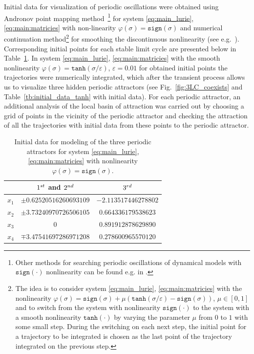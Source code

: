 \documentclass{ifacconf}
\theoremstyle{plain}
\begin{document}
Initial data for visualization of periodic oscillations were obtained using
Andronov point mapping method~\citep{AndronovVKh-1966}\footnote{Other methods for searching periodic oscillations
of dynamical models with $\texttt{sign}(\cdot)$ nonlinearity
can be found e.g. in \citep{Tsypkin-1984,Boiko-2008}.}
for system \eqref{eq:main_lurie}, \eqref{eq:main:matricies}
with non-linearity $\varphi(\sigma) = \texttt{sign}(\sigma)$
and numerical continuation method\footnote{
The idea is to consider system \eqref{eq:main_lurie}, \eqref{eq:main:matricies}
  with the nonlinearity $\varphi(\sigma) = \texttt{sign}(\sigma)
  + \mu (\texttt{tanh}(\sigma / \varepsilon) - \texttt{sign}(\sigma))$, $\mu \in [0,1]$
  and to switch from the system with
  nonlinearity $\texttt{sign}(\cdot)$ to the system with a smooth nonlinearity
  $\texttt{tanh}(\cdot)$ by varying the parameter $\mu$ from $0$ to $1$ with some small step.
  During the switching on each next step,
  the initial point for a trajectory to be integrated is chosen
  as the last point of the trajectory integrated on the previous step.
} for smoothing the discontinuous nonlinearity
(see e.g.~\citep{LeonovK-2013-IJBC,LeonovKKM-2017}).
Corresponding initial points for each stable limit cycle
are presented below in Table~\ref{tb:initial_data_sign}.
In system \eqref{eq:main_lurie}, \eqref{eq:main:matricies}
with the smooth nonlinearity $\varphi(\sigma) = \texttt{tanh}(\sigma / \varepsilon)$,
$\varepsilon = 0.01$
for obtained initial points the trajectories were numerically integrated,
which after the transient process allows us to visualize
three hidden periodic attractors (see Fig.~\ref{fig:3LC_coexists} and
Table~\ref{tb:initial_data_tanh} with initial data).
For each periodic attractor, an additional analysis of the local basin of attraction was carried out
by choosing a grid of points in the vicinity of the periodic attractor and checking the attraction
of all the trajectories with initial data from these points to the periodic attractor.
\begin{table}[h!]
\begin{center}
\caption{Initial data for modeling of the three
periodic attractors for system \eqref{eq:main_lurie}, \eqref{eq:main:matricies}
with nonlinearity $\varphi(\sigma) = \texttt{sign}(\sigma)$.}\label{tb:initial_data_sign}
\begin{tabular}{ccc}
& $1^{\rm st}$ and $2^{\rm nd}$ & $3^{\rm rd}$\\
\hline\hline
$x_1$ & $\pm0.62520516260693109$ & $-2.113517446278802$ \\
$x_2$ & $\pm3.73240970726506105$ & $0.664336179538623$ \\
$x_3$ & $0$ & $0.891912878629890$ \\
$x_4$ & $\mp3.47541697286971208$ & $0.278600965570120$ \\
\hline
\end{tabular}
\end{center}
\end{table}
\end{document}

